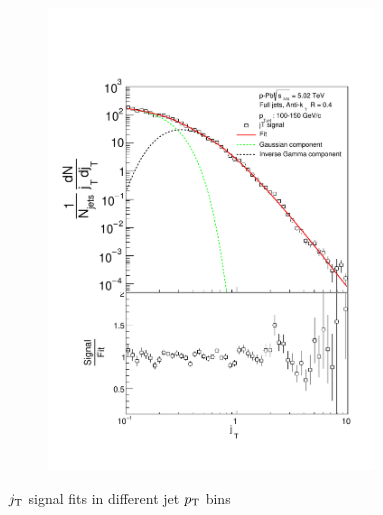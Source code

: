 \begin{figure}
\begin{subfigure}{0.24\textwidth}
\includegraphics[width=0.95\textwidth]{results/JetConejTSignalFit/JetConejTSignalFitNFin00JetPt07perconeBgBayes}
\end{subfigure}
\caption{$j_{\rm T}$ signal fits in different jet $p_{\rm T}$ bins}
\label{fig:fits}
\end{figure}




